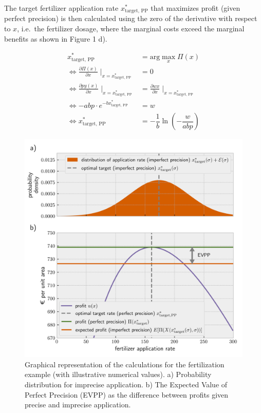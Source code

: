 The target fertilizer application rate $x^\ast_\text{target, PP}$ that maximizes profit (given perfect precision) is then calculated using the zero of the derivative with respect to $x$, i.e.~the fertilizer dosage, where the marginal costs exceed the marginal benefits as shown in Figure 1 d).

\begin{align}
x^\ast_\text{target, PP} &= \text{arg}\max_x \Pi(x) \\
\iff \frac{\partial \Pi(x)}{\partial x} \mid_{x = x^\ast_\text{target, PP}} &= 0\\
\iff \frac{\partial py(x)}{\partial x} \mid_{x = x^\ast_\text{target, PP}} &= \frac{\partial wx}{\partial x} \mid_{x = x^\ast_\text{target, PP}}\\
\iff -abp \cdot e^{-bx^\ast_\text{target, PP}} &= w\\
\iff x^\ast_\text{target, PP} &=  -\dfrac{1}{b} \ln\left(-\dfrac{w}{abp}\right)
\end{align}

\begin{figure}
\centering
\includegraphics{imgs/synplot2.png}
\caption{Graphical representation of the calculations for the fertilization example (with illustrative numerical values). a) Probability distribution for imprecise application. b) The Expected Value of Perfect Precision (EVPP) as the difference between profits given precise and imprecise application.}
\end{figure}

